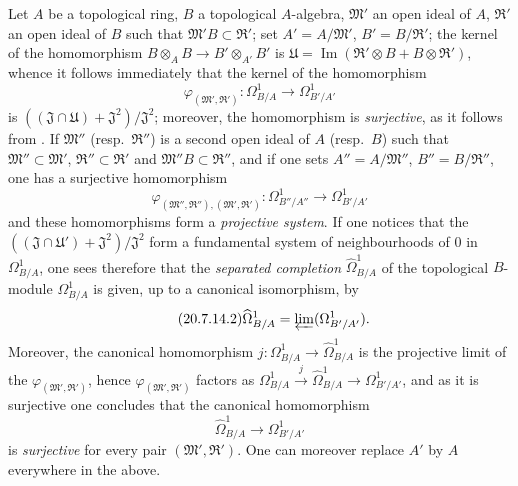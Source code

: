 \begin{env}[20.7.14]
\label{0.20.7.14}
Let $A$ be a topological ring, $B$ a topological $A$-algebra, $\mathfrak{M}'$ an open ideal of $A$, $\mathfrak{R}'$ an open ideal of $B$ such that $\mathfrak{M}'B\subset\mathfrak{R}'$; set $A'=A/\mathfrak{M}'$, $B'=B/\mathfrak{R}'$; the kernel of the homomorphism $B\otimes_A B\to B'\otimes_{A'} B'$ is $\mathfrak{U}=\operatorname{Im}(\mathfrak{R}'\otimes B+B\otimes\mathfrak{R}')$, whence it follows immediately that the kernel of the homomorphism
\begin{equation}
\tag{20.7.14.1}
  \label{0.20.7.14.1}
  \varphi_{(\mathfrak{M}',\mathfrak{R}')}:\Omega^1_{B/A}\to\Omega^1_{B'/A'}
\end{equation}
is $((\mathfrak{J}\cap\mathfrak{U})+\mathfrak{J}^2)/\mathfrak{J}^2$; moreover, the homomorphism  is \emph{surjective}, as it follows from .
If $\mathfrak{M}''$ (resp.\ $\mathfrak{R}''$) is a second open ideal of $A$ (resp.\ $B$) such that $\mathfrak{M}''\subset\mathfrak{M}'$, $\mathfrak{R}''\subset\mathfrak{R}'$ and $\mathfrak{M}''B\subset\mathfrak{R}''$, and if one sets $A''=A/\mathfrak{M}''$, $B''=B/\mathfrak{R}''$, one has a surjective homomorphism
\[
  \varphi_{(\mathfrak{M}'',\mathfrak{R}''),({\mathfrak{M}',\mathfrak{R}'})}:\Omega^1_{B''/A''}\to\Omega^1_{B'/A'}
\]
and these homomorphisms form a \emph{projective system}.
If one notices that the $((\mathfrak{J}\cap\mathfrak{U}')+\mathfrak{J}^2)/\mathfrak{J}^2$ form a fundamental system of neighbourhoods of $0$ in $\Omega^1_{B/A}$, one sees therefore that the \emph{separated completion} $\widehat{\Omega}^1_{B/A}$ of the topological $B$-module $\Omega^1_{B/A}$ is given, up to a canonical isomorphism, by
\begin{equation}
\tag{20.7.14.2}
  \label{0.20.7.14.2}
  \widehat{\Omega}^1_{B/A}=\varprojlim(\Omega^1_{B'/A'}).
\end{equation}
Moreover, the canonical homomorphism $j:\Omega^1_{B/A}\to\widehat{\Omega}^1_{B/A}$ is the projective limit of the $\varphi_{(\mathfrak{M}',\mathfrak{R}')}$, hence $\varphi_{(\mathfrak{M}',\mathfrak{R}')}$ factors as $\Omega^1_{B/A}\xrightarrow{j}\widehat{\Omega}^1_{B/A}\to\Omega^1_{B'/A'}$, and as it is surjective one concludes that the canonical homomorphism
\begin{equation}
\tag{20.7.14.3}
  \label{0.20.7.14.3}
  \widehat{\Omega}^1_{B/A}\to\Omega^1_{B'/A'}
\end{equation}
is \emph{surjective} for every pair $(\mathfrak{M}',\mathfrak{R}')$.
One can moreover replace $A'$ by $A$ everywhere in the above.


\end{env}

